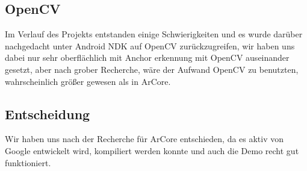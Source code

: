 \subsection{OpenCV}
Im Verlauf des Projekts entstanden einige Schwierigkeiten und es wurde darüber nachgedacht
unter Android NDK auf OpenCV zurückzugreifen, wir haben uns dabei nur sehr oberflächlich
mit Anchor erkennung mit OpenCV auseinander gesetzt, aber nach grober Recherche, wäre der
Aufwand OpenCV zu benutzten, wahrscheinlich größer gewesen als in ArCore.

\subsection{Entscheidung}
Wir haben uns nach der Recherche für ArCore entschieden, da es aktiv von Google entwickelt
wird, kompiliert werden konnte und auch die Demo recht gut funktioniert. 
